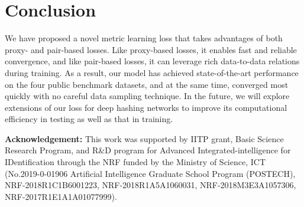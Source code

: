 \documentclass[10pt,twocolumn,letterpaper]{article}
\begin{document}
 



\section{Conclusion}
\label{sec:conclusion}
We have proposed a novel metric learning loss that takes advantages of both proxy- and pair-based losses.
Like proxy-based losses, it enables fast and reliable convergence, and like pair-based losses, it can leverage rich data-to-data relations during training.
As a result, our model has achieved state-of-the-art performance on the four public benchmark datasets, and at the same time, converged most quickly with no careful data sampling technique. 
In the future, we will explore extensions of our loss for deep hashing networks to improve its computational efficiency in testing as well as that in training.


\vspace{0.3cm}
{\small
\noindent \textbf{Acknowledgement:} This work was supported by IITP grant, Basic Science Research Program, and R\&D program for Advanced Integrated-intelligence for IDentification through the NRF funded by the Ministry of Science, ICT (No.2019-0-01906 Artificial Intelligence Graduate School Program (POSTECH), NRF-2018R1C1B6001223, NRF-2018R1A5A1060031, NRF-2018M3E3A1057306, NRF-2017R1E1A1A01077999).
} 
{\small


}


\end{document}
